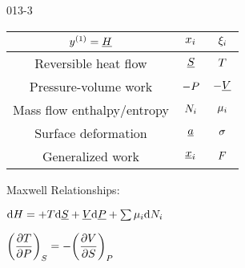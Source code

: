 \begin{mitframe}{013-3}

    

\begin{longtable}{ | c | c | c | } 
 \hline
 	$ y^{(1)}= \uline{\enthalpy}$& $\conjcoor$ & $\conjcoortwo_{\state}$ \\ \hline
	Reversible heat flow & $\uline{\entropy}$ & $\Temp$ \\ \hline 
	Pressure-volume work & $-\p$ & $-\uline{\vol}$  \\ \hline
 	Mass flow enthalpy/entropy& $\nummoles_{\state}$ & $\chempot_{\state}$ \\ \hline   
	Surface deformation & $\totalsa$ & $\surftens$ \\ \hline   
    Generalized work & $\gendisp_{\state}$ & $\force$ \\ \hline
 
 
\end{longtable}

    
    
\begin{listone}
        
    \item Maxwell Relationships:
        
    \item $\mathrm{d}\enthalpy = +\Temp\mathrm{d}\uline{\entropy} + \uline{\vol}\mathrm{d}\uline{\p} + \sum\nolimits\chempot_{\state}\mathrm{d}\nummoles_{\state}$
         
    \item $\bigg(\dfrac{\partial\Temp}{\partial\p}\bigg)_{\entropy} = -\bigg(\dfrac{\partial\vol}{\partial\entropy}\bigg)_{\p}$
    
\end{listone}			

\end{mitframe}